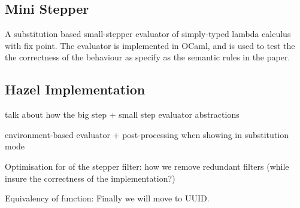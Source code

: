 \subsection{Mini Stepper}

A substitution based small-stepper evaluator of simply-typed lambda calculus with
fix point. The evaluator is implemented in OCaml, and is used to test the the
correctness of the behaviour as specify as the semantic rules in the paper.

\subsection{Hazel Implementation}

talk about how the big step + small step evaluator abstractions

environment-based evaluator + post-processing when showing in substitution mode

Optimisation for of the stepper filter: how we remove redundant filters (while
insure the correctness of the implementation?)

Equivalency of function:
Finally we will move to UUID.
